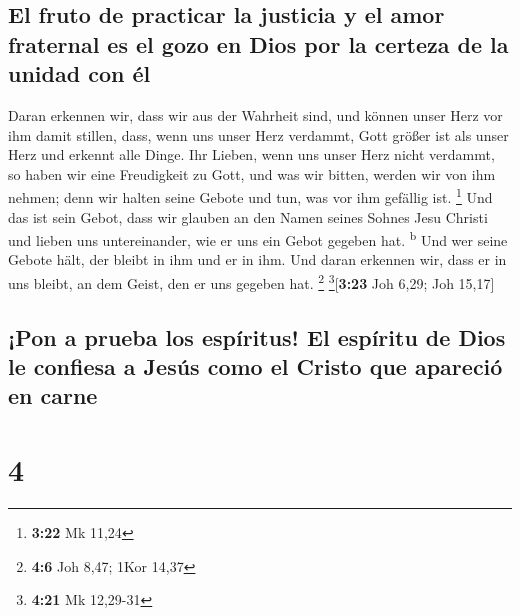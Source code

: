 \hypertarget{el-fruto-de-practicar-la-justicia-y-el-amor-fraternal-es-el-gozo-en-dios-por-la-certeza-de-la-unidad-con-uxe9l}{%
\subsection{El fruto de practicar la justicia y el amor fraternal es el
gozo en Dios por la certeza de la unidad con
él}\label{el-fruto-de-practicar-la-justicia-y-el-amor-fraternal-es-el-gozo-en-dios-por-la-certeza-de-la-unidad-con-uxe9l}}

 Daran erkennen wir, dass wir aus der Wahrheit sind, und
können unser Herz vor ihm damit stillen,  dass, wenn uns
unser Herz verdammt, Gott größer ist als unser Herz und erkennt alle
Dinge.  Ihr Lieben, wenn uns unser Herz nicht verdammt,
so haben wir eine Freudigkeit zu Gott,  und was wir
bitten, werden wir von ihm nehmen; denn wir halten seine Gebote und tun,
was vor ihm gefällig ist. \footnote{\textbf{3:22} Mk 11,24}
 Und das ist sein Gebot, dass wir glauben an den Namen
seines Sohnes Jesu Christi und lieben uns untereinander, wie er uns ein
Gebot gegeben hat. \textsuperscript{b}  Und wer seine
Gebote hält, der bleibt in ihm und er in ihm. Und daran erkennen wir,
dass er in uns bleibt, an dem Geist, den er uns gegeben hat. \footnote{\textbf{4:6}
  Joh 8,47; 1Kor 14,37} \footnote{\textbf{4:21} Mk 12,29-31}{[}\textbf{3:23}
Joh 6,29; Joh 15,17{]}

\hypertarget{pon-a-prueba-los-espuxedritus-el-espuxedritu-de-dios-le-confiesa-a-jesuxfas-como-el-cristo-que-apareciuxf3-en-carne}{%
\subsection{¡Pon a prueba los espíritus! El espíritu de Dios le confiesa
a Jesús como el Cristo que apareció en
carne}\label{pon-a-prueba-los-espuxedritus-el-espuxedritu-de-dios-le-confiesa-a-jesuxfas-como-el-cristo-que-apareciuxf3-en-carne}}

\hypertarget{section-3}{%
\section{4}\label{section-3}}

